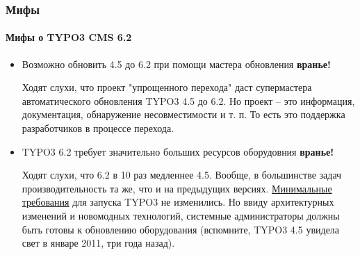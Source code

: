 \begin{frame}[fragile]
	\frametitle{Мифы}
	\framesubtitle{Мифы о TYPO3 CMS 6.2}

	\begin{itemize}
		\item Возможно обновить 4.5 до 6.2 при помощи мастера обновления
			\tabto{9cm}\color{red}\textbf{\textrightarrow вранье!}\color{black}

			\smaller
				Ходят слухи, что проект "упрощенного перехода" даст супермастера автоматического обновления TYPO3 4.5 до 6.2.
				Но проект – это информация, документация, обнаружение несовместимости и т. п. То есть это поддержка
				разработчиков в процессе перехода.
			\normalsize

		\item TYPO3 6.2 требует значительно больших ресурсов оборудовния
			\tabto{9cm}\color{red}\textbf{\textrightarrow вранье!}\color{black}

			\smaller
				Ходят слухи, что  6.2 в 10 раз медленнее 4.5. Вообще, в большинстве задач производительность та же,
				что и на предыдущих версиях. \href{http://typo3.org/about/typo3-the-cms/system-requirements/}{Минимальные требования} для запуска TYPO3 не изменились. Но ввиду архитектурных изменений и новомодных технологий,
				системные администраторы должны быть готовы к обновлению оборудования (вспомните,
				TYPO3 4.5 увидела свет в январе 2011, три года назад).
			\normalsize

	\end{itemize}

\end{frame}


